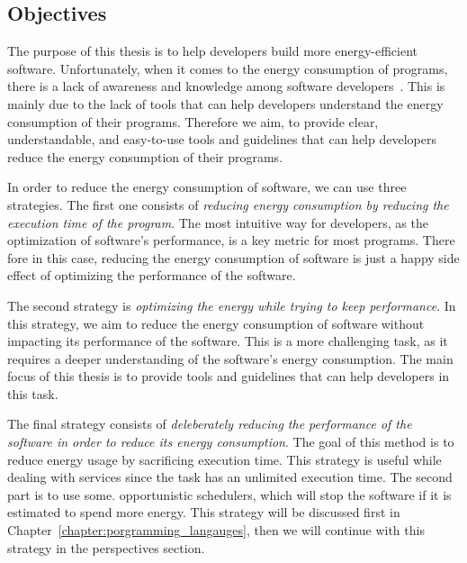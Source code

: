 \subsection*{Objectives}
The purpose of this thesis is to help developers build more energy-efficient software. Unfortunately, when it comes to the energy consumption of programs, there is a lack of awareness and knowledge among software developers~\cite{ournani2020reducing,pang2015programmers,pinto2014mining}. This is mainly due to the lack of tools that can help developers understand the energy consumption of their programs. Therefore we aim, to provide clear, understandable, and easy-to-use tools and guidelines that can help developers reduce the energy consumption of their programs.

In order to reduce the energy consumption of software, we can use three strategies.
The first one consists of \emph{reducing energy consumption by reducing the execution time of the program}. The most intuitive way for developers, as the optimization of software's performance, is a key metric for most programs. There fore in this case, reducing the energy consumption of software is just a happy side effect of optimizing the performance of the software.


The second strategy is \emph{optimizing the energy while trying to keep performance}. In this strategy, we aim to reduce the energy consumption of software without impacting its performance of the software. This is a more challenging task, as it requires a deeper understanding of the software's energy consumption. The main focus of this thesis is to provide tools and guidelines that can help developers in this task.


The final strategy consists of \emph{deleberately reducing the performance of the software in order to reduce its energy consumption}. The goal of this method is to reduce energy usage by sacrificing execution time. This strategy is useful while dealing with services since the task has an unlimited execution time. The second part is to use some. opportunistic schedulers, which will stop the software if it is estimated to spend more energy. This strategy will be discussed first in Chapter~\ref{chapter:porgramming_langauges}, then we will continue with this strategy in the perspectives section.



